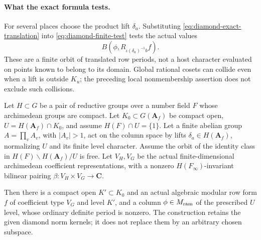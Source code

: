\paragraph{What the exact formula tests.}
For several places choose the product lift $\delta_a$.
Substituting \eqref{eq:diamond-exact-translation} into
\eqref{eq:diamond-finite-test} tests the actual values
\[
 B(\phi,R_{\iota(\delta_a)^{-1}b}f).
\]
These are a finite orbit of translated row periods, not a host
character evaluated on points known to belong to its domain.
Global rational cosets can collide even when a lift is outside
$K_u$; the preceding local nonmembership assertion does not
exclude such collisions.

\begin{proposition}
\label{prop:refined-level-ram-period}
Let $H\subset G$ be a pair of reductive groups over a number field
$F$ whose archimedean groups are compact.  Let
$K_0\subset G(\mathbf A_f)$ be compact open,
$U=H(\mathbf A_f)\cap K_0$, and assume
$H(F)\cap U=\{1\}$.
Let a finite abelian group $A=\prod_vA_v$, with $|A_v|>1$, act
on the column space by lifts $\delta_a\in H(\mathbf A_f)$,
normalizing $U$ and its finite level character.  Assume the orbit
of the identity class in
$H(F)\backslash H(\mathbf A_f)/U$ is free.
Let $V_H,V_G$ be the actual finite-dimensional archimedean coefficient
representations, with a nonzero $H(F_\infty)$-invariant bilinear
pairing $\beta:V_H\times V_G\to\mathbf C$.

Then there is a compact open $K'\subset K_0$ and an actual algebraic
modular row form $f$ of coefficient type $V_G$ and level $K'$,
and a column $\phi\in M_{\rm ram}$ of the prescribed $U$ level,
whose ordinary definite period is nonzero.  The construction retains
the given diamond norm kernels; it does not replace them by an
arbitrary chosen subspace.
\end{proposition}
